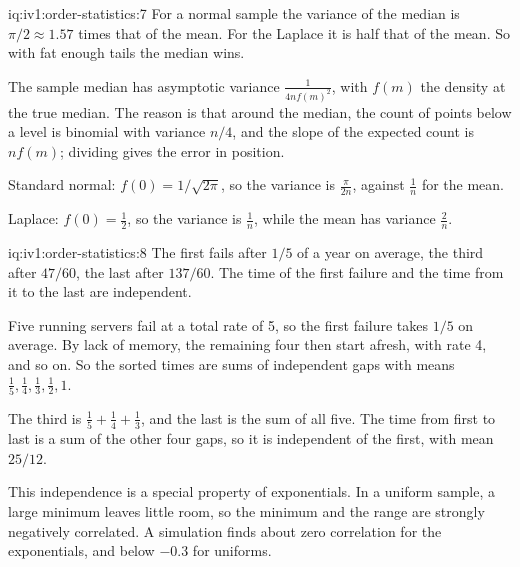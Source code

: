 \begin{solution}{iq:iv1:order-statistics:7}
For a normal sample the variance of the median is $\pi/2 \approx 1.57$ times that of the mean. For the Laplace it is half that of the mean. So with fat enough tails the median wins.

The sample median has asymptotic variance $\frac{1}{4 n f(m)^2}$, with $f(m)$ the density at the true median. The reason is that around the median, the count of points below a level is binomial with variance $n/4$, and the slope of the expected count is $n f(m)$; dividing gives the error in position.

Standard normal: $f(0) = 1/\sqrt{2\pi}$, so the variance is $\frac{\pi}{2n}$, against $\frac1n$ for the mean.

Laplace: $f(0) = \tfrac12$, so the variance is $\frac1n$, while the mean has variance $\frac2n$.

\end{solution}

\begin{solution}{iq:iv1:order-statistics:8}
The first fails after $1/5$ of a year on average, the third after $47/60$, the last after $137/60$. The time of the first failure and the time from it to the last are independent.

Five running servers fail at a total rate of 5, so the first failure takes $1/5$ on average. By lack of memory, the remaining four then start afresh, with rate 4, and so on. So the sorted times are sums of independent gaps with means $\tfrac15, \tfrac14, \tfrac13, \tfrac12, 1$.

The third is $\tfrac15 + \tfrac14 + \tfrac13$, and the last is the sum of all five. The time from first to last is a sum of the other four gaps, so it is independent of the first, with mean $25/12$.

This independence is a special property of exponentials. In a uniform sample, a large minimum leaves little room, so the minimum and the range are strongly negatively correlated. A simulation finds about zero correlation for the exponentials, and below $-0.3$ for uniforms.

\end{solution}


